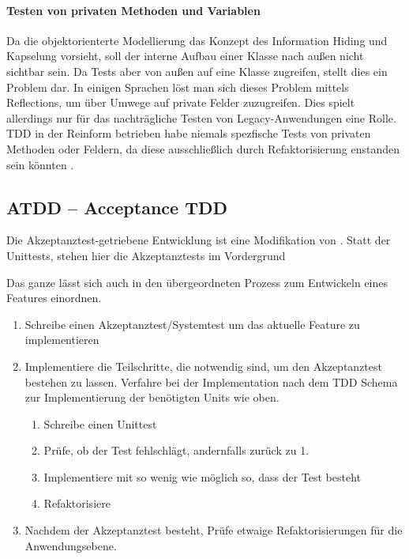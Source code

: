   \paragraph{Testen von privaten Methoden und Variablen} Da die objektorienterte Modellierung das Konzept des Information Hiding und Kapselung vorsieht, soll der interne Aufbau einer Klasse nach außen nicht sichtbar sein. Da Tests aber von außen auf eine Klasse zugreifen, stellt dies ein Problem dar. In einigen Sprachen löst man sich dieses Problem mittels Reflections, um über Umwege auf private Felder zuzugreifen. Dies spielt allerdings nur für das nachträgliche Testen von Legacy-Anwendungen eine Rolle. TDD in der Reinform betrieben habe niemals spezfische Tests von privaten Methoden oder Feldern, da diese ausschließlich durch Refaktorisierung enstanden sein könnten \citep{caroli_agile_2008}.
 
  
  
  
  \subsection{ATDD -- Acceptance TDD}
  \label{sec:attd}
  Die Akzeptanztest-getriebene Entwicklung ist eine Modifikation von . Statt der Unittests, stehen hier die Akzeptanztests im Vordergrund
  
  Das ganze lässt sich auch in den übergeordneten Prozess zum Entwickeln eines Features einordnen.
  \begin{enumerate}
   \item Schreibe einen Akzeptanztest/Systemtest um das aktuelle Feature zu implementieren
   \item Implementiere die Teilschritte, die notwendig sind, um den Akzeptanztest bestehen zu lassen. Verfahre bei der Implementation nach dem TDD Schema zur Implementierung der benötigten Units wie oben.
    \begin{enumerate}
     \item Schreibe einen Unittest
     \item Prüfe, ob der Test fehlschlägt, andernfalls zurück zu 1.
     \item Implementiere mit so wenig wie möglich so, dass der Test besteht
     \item Refaktorisiere
    \end{enumerate}
   \item Nachdem der Akzeptanztest besteht, Prüfe etwaige Refaktorisierungen für die Anwendungsebene.   
  \end{enumerate}
  

